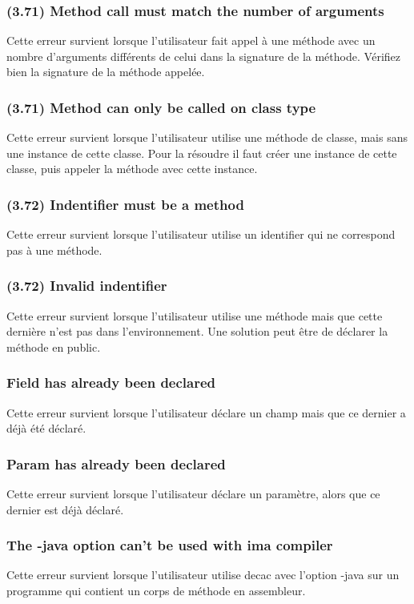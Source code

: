 \documentclass[12pt, a4paper, one side]{article}
\begin{document}
\subsubsection{(3.71) Method call must match the number of arguments}
Cette erreur survient lorsque l'utilisateur fait appel à une méthode avec un nombre d'arguments différents de celui dans la signature de la méthode. Vérifiez bien la signature de la méthode appelée.

\subsubsection{(3.71) Method can only be called on class type}
Cette erreur survient lorsque l'utilisateur utilise une méthode de classe, mais sans une instance de cette classe. Pour la résoudre il faut créer une instance de cette classe, puis appeler la méthode avec cette instance.

\subsubsection{(3.72) Indentifier must be a method}
Cette erreur survient lorsque l'utilisateur utilise un identifier qui ne correspond pas à une méthode.

\subsubsection{(3.72) Invalid indentifier}
Cette erreur survient lorsque l'utilisateur utilise une méthode mais que cette dernière n'est pas dans l'environnement. Une solution peut être de déclarer la méthode en public.

\subsubsection{Field has already been declared}
Cette erreur survient lorsque l'utilisateur déclare un champ mais que ce dernier a déjà été déclaré.

\subsubsection{Param has already been declared}
Cette erreur survient lorsque l'utilisateur déclare un paramètre, alors que ce dernier est déjà déclaré.

\subsubsection{The -java option can't be used with ima compiler}
Cette erreur survient lorsque l'utilisateur utilise decac avec l'option -java sur un programme qui contient un corps de méthode en assembleur.
\end{document}
